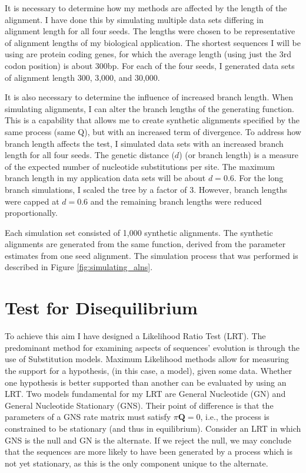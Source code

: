 It is necessary to determine how my methods are affected by the length of the alignment. I have done this by simulating multiple data sets differing in alignment length for all four seeds. The lengths were chosen to be representative of alignment lengths of my biological application. The shortest sequences I will be using are protein coding genes, for which the average length (using just the 3rd codon position) is about 300bp. For each of the four seeds, I generated data sets of alignment length 300, 3,000, and 30,000.   

It is also necessary to determine the influence of increased branch length. When simulating alignments, I can alter the branch lengths of the generating function. This is a capability that allows me to create synthetic alignments specified by the same process (same $\mathrm{Q}$), but with an increased term of divergence. To address how branch length affects the test, I simulated data sets with an increased branch length for all four seeds. The genetic distance ($d$) (or branch length) is a measure of the expected number of nucleotide substitutions per site. The maximum branch length in my application data sets will be about $d=0.6$. For the long branch simulations, I scaled the tree by a factor of 3. However, branch lengths were capped at $d=0.6$ and the remaining branch lengths were reduced proportionally. 

Each simulation set consisted of 1,000 synthetic alignments. The synthetic alignments are generated from the same function, derived from the parameter estimates from one seed alignment. The simulation process that was performed is described in Figure \ref{fig:simulating_alns}.



\section{Test for Disequilibrium}

To achieve this aim I have designed a Likelihood Ratio Test (LRT). The predominant method for examining aspects of sequences' evolution is through the use of \glspl{Substitution model}. \Gls{Maximum Likelihood} methods allow for measuring the support for a hypothesis, (in this case, a \gls{model}), given some data. Whether one hypothesis is better supported than another can be evaluated by using an LRT. Two models fundamental for my LRT are General Nucleotide (GN) and General Nucleotide Stationary (GNS). Their point of difference is that the parameters of a GNS rate matrix must satisfy $\pi\mathbf{Q}=0$, i.e., the process is constrained to be stationary (and thus in equilibrium). Consider an LRT in which GNS is the null and GN is the alternate. If we reject the null, we may conclude that the sequences are more likely to have been generated by a process which is not yet stationary, as this is the only component unique to the alternate.

